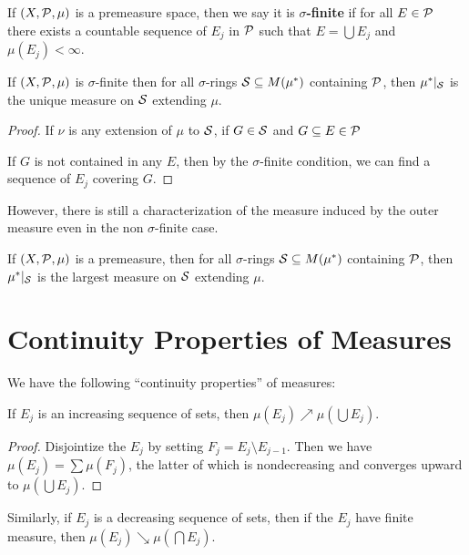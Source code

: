 \begin{definition}
    If $(X, \mathcal P, \mu)$ is a premeasure space, then we say it is \textbf{$\sigma$-finite} if for all $E \in \mathcal P$ there exists a countable sequence of $E_j$ in $\mathcal P$ such that $E = \bigcup E_j$ and $\mu(E_j) < \infty$.
\end{definition}

\begin{theorem}
    If $(X, \mathcal P, \mu)$ is $\sigma$-finite then for all $\sigma$-rings $\mathcal S \subseteq M(\mu^*)$ containing $\mathcal P$, then $\mu^*\vert_\mathcal{S}$ is the unique measure on $\mathcal S$ extending $\mu$.
\end{theorem}

\begin{proof}
    If $\nu$ is any extension of $\mu$ to $\mathcal S$, if $G \in \mathcal S$ and $G \subseteq E \in \mathcal P$ 

    If $G$ is not contained in any $E$, then by the $\sigma$-finite condition, we can find a sequence of $E_j$ covering $G$.
\end{proof}

However, there is still a characterization of the measure induced by the outer measure even in the non $\sigma$-finite case.

\begin{proposition}
    If $(X, \mathcal P, \mu)$ is a premeasure, then for all $\sigma$-rings $\mathcal S \subseteq M(\mu^*)$ containing $\mathcal P$, then $\mu^*\vert_\mathcal{S}$ is the largest measure on $\mathcal S$ extending $\mu$.
\end{proposition}

\section{Continuity Properties of Measures}

We have the following ``continuity properties'' of measures:

\begin{proposition}
    If $E_j$ is an increasing sequence of sets, then $\mu(E_j) \nearrow \mu(\bigcup E_j)$.
\end{proposition}

\begin{proof}
    Disjointize the $E_j$ by setting $F_j = E_j \setminus E_{j - 1}$. Then we have $\mu(E_j) = \sum \mu(F_j)$, the latter of which is nondecreasing and converges upward to $\mu(\bigcup E_j)$.
\end{proof}

\begin{proposition}
    Similarly, if $E_j$ is a decreasing sequence of sets, then if the $E_j$ have finite measure, then $\mu(E_j) \searrow \mu(\bigcap E_j)$.
\end{proposition}

